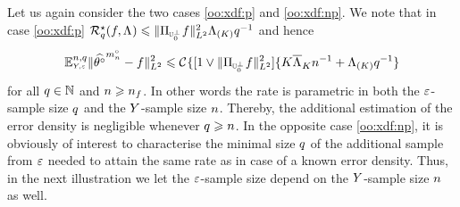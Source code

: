 \begin{te}
Let us again consider the   two cases \ref{oo:xdf:p} and
\ref{oo:xdf:np}. We note that in case \ref{oo:xdf:p}
$\mRa{\xdf,\iSv}\leq
\VnormLp{\Proj[{\mHiH[0]^\perp}]\xdf}^2\miSv[K]\ssE^{-1}$
and hence
\begin{equation}\label{oo:au:p}
\FuEx[\ssY,\ssE]{\rY,\rE}\VnormLp{\hxdfPr[\oDi{\ssY}]-\xdf}^2\leq
\cst{}\{[1\vee\VnormLp{\Proj[{\mHiH[0]^\perp}]\xdf}^2]\{
K\oiSv[K]\ssY^{-1}+\miSv[K]\ssE^{-1}\}
\end{equation}
for all $\ssE\in\Nz$ and $\ssY\geq\ssY_{\xdf}$. In other words the
rate is parametric in both the $\rE$-sample size $\ssE$ and the $\rY$-sample size $\ssY$. Thereby, the  additional estimation of the error
density is negligible whenever $\ssE\geq\ssY$.  In the
opposite case \ref{oo:xdf:np}, it is obviously of interest to characterise the minimal size $\ssE$ of the additional
sample from $\rE$ needed to attain the same rate as in case of a known
error density. Thus, in the next illustration we let the $\rE$-sample size 
depend on the $\rY$-sample size $\ssY$ as well. 
\end{te}
